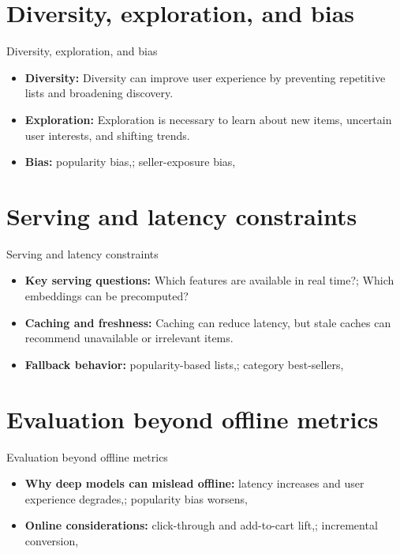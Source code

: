\documentclass[aspectratio=169]{beamer}
\begin{document}
\section{Diversity, exploration, and bias}

\begin{frame}{Diversity, exploration, and bias}
  \begin{itemize}
    \item \textbf{Diversity:} Diversity can improve user experience by preventing repetitive lists and broadening discovery.
    \item \textbf{Exploration:} Exploration is necessary to learn about new items, uncertain user interests, and shifting trends.
    \item \textbf{Bias:} popularity bias,; seller-exposure bias,
  \end{itemize}
\end{frame}

\section{Serving and latency constraints}

\begin{frame}{Serving and latency constraints}
  \begin{itemize}
    \item \textbf{Key serving questions:} Which features are available in real time?; Which embeddings can be precomputed?
    \item \textbf{Caching and freshness:} Caching can reduce latency, but stale caches can recommend unavailable or irrelevant items.
    \item \textbf{Fallback behavior:} popularity-based lists,; category best-sellers,
  \end{itemize}
\end{frame}

\section{Evaluation beyond offline metrics}

\begin{frame}{Evaluation beyond offline metrics}
  \begin{itemize}
    \item \textbf{Why deep models can mislead offline:} latency increases and user experience degrades,; popularity bias worsens,
    \item \textbf{Online considerations:} click-through and add-to-cart lift,; incremental conversion,
  \end{itemize}
\end{frame}
\end{document}
